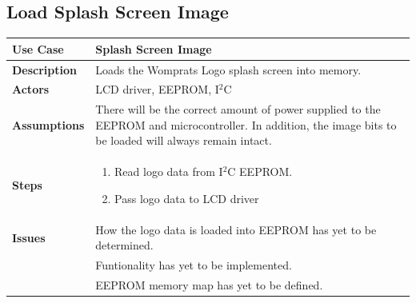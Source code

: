 \documentclass{article}
\begin{document}
\subsection{Load Splash Screen Image}
\begin{tabular}{|p{1in}|p{5in}|}
\hline
\textbf{Use Case} & Splash Screen Image\\
\hline
\textbf{Description} & Loads the Womprats Logo splash screen into memory.\\
\hline
\textbf{Actors} & LCD driver, EEPROM, I$^2$C\\
\hline
\textbf{Assumptions} & There will be the correct amount of power supplied to the EEPROM and microcontroller.  In addition, the image bits to be loaded will always remain intact.\\
\hline
\textbf{Steps} & \begin{enumerate}
\item Read logo data from I$^2$C EEPROM.
\item Pass logo data to LCD driver
\end{enumerate}\\
\hline
\textbf{Issues} & How the logo data is loaded into EEPROM has yet to be determined.\\
& Funtionality has yet to be implemented.\\
& EEPROM memory map has yet to be defined.\\
\hline
\end{tabular}
\end{document}
